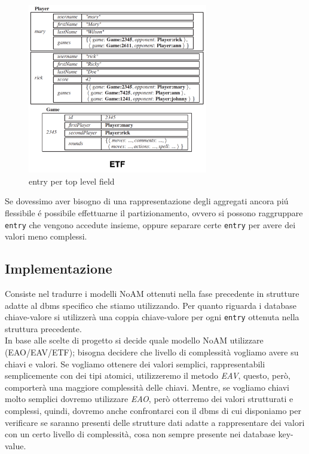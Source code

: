\begin{figure}[H]
    \begin{center}
        \includegraphics[width=0.7\textwidth]{img/etf}
    \end{center}
\caption{entry per top level field}
\end{figure}
Se dovessimo aver bisogno di una rappresentazione degli aggregati ancora piú flessibile é possibile effettuarne il partizionamento,
ovvero si possono raggruppare \texttt{entry} che vengono accedute insieme, oppure separare certe \texttt{entry} per avere dei
valori meno complessi.

\subsection{Implementazione}
Consiste nel tradurre i modelli NoAM ottenuti nella fase precedente in strutture adatte al dbms specifico che stiamo utilizzando.
Per quanto riguarda i database chiave-valore si utilizzerà una coppia chiave-valore per ogni \texttt{entry} ottenuta nella struttura
precedente.\\
In base alle scelte di progetto si decide quale modello NoAM utilizzare (EAO/EAV/ETF); bisogna decidere che livello di
complessità vogliamo avere su chiavi e valori.
Se vogliamo ottenere dei valori semplici, rappresentabili semplicemente con dei tipi atomici, utilizzeremo il metodo \emph{EAV}, questo, però, comporterà una maggiore complessità delle chiavi.
Mentre, se vogliamo chiavi molto semplici dovremo utilizzare \emph{EAO}, però otterremo dei valori strutturati e complessi, quindi, dovremo anche confrontarci con
il dbms di cui disponiamo per verificare se saranno presenti delle strutture dati adatte a rappresentare dei valori con un certo livello di complessità, cosa non sempre
presente nei database key-value.\\

